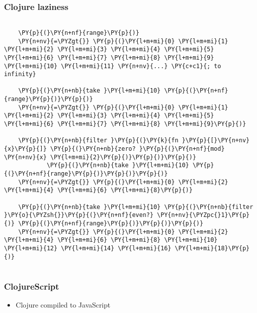 \begin{frame}[fragile]
  \frametitle{Clojure laziness}
  \begin{Verbatim}[commandchars=\\\{\}]

    \PY{p}{(}\PY{n+nf}{range}\PY{p}{)}
    \PY{n+nv}{=\PYZgt{}} \PY{p}{(}\PY{l+m+mi}{0} \PY{l+m+mi}{1} \PY{l+m+mi}{2} \PY{l+m+mi}{3} \PY{l+m+mi}{4} \PY{l+m+mi}{5} \PY{l+m+mi}{6} \PY{l+m+mi}{7} \PY{l+m+mi}{8} \PY{l+m+mi}{9} \PY{l+m+mi}{10} \PY{l+m+mi}{11} \PY{n+nv}{...} \PY{c+c1}{; to infinity}

    \PY{p}{(}\PY{n+nb}{take }\PY{l+m+mi}{10} \PY{p}{(}\PY{n+nf}{range}\PY{p}{)}\PY{p}{)}
    \PY{n+nv}{=\PYZgt{}} \PY{p}{(}\PY{l+m+mi}{0} \PY{l+m+mi}{1} \PY{l+m+mi}{2} \PY{l+m+mi}{3} \PY{l+m+mi}{4} \PY{l+m+mi}{5} \PY{l+m+mi}{6} \PY{l+m+mi}{7} \PY{l+m+mi}{8} \PY{l+m+mi}{9}\PY{p}{)}

    \PY{p}{(}\PY{n+nb}{filter }\PY{p}{(}\PY{k}{fn }\PY{p}{[}\PY{n+nv}{x}\PY{p}{]} \PY{p}{(}\PY{n+nb}{zero? }\PY{p}{(}\PY{n+nf}{mod} \PY{n+nv}{x} \PY{l+m+mi}{2}\PY{p}{)}\PY{p}{)}\PY{p}{)}
            \PY{p}{(}\PY{n+nb}{take }\PY{l+m+mi}{10} \PY{p}{(}\PY{n+nf}{range}\PY{p}{)}\PY{p}{)}\PY{p}{)}
    \PY{n+nv}{=\PYZgt{}} \PY{p}{(}\PY{l+m+mi}{0} \PY{l+m+mi}{2} \PY{l+m+mi}{4} \PY{l+m+mi}{6} \PY{l+m+mi}{8}\PY{p}{)}

    \PY{p}{(}\PY{n+nb}{take }\PY{l+m+mi}{10} \PY{p}{(}\PY{n+nb}{filter }\PY{o}{\PYZsh{}}\PY{p}{(}\PY{n+nf}{even?} \PY{n+nv}{\PYZpc{}1}\PY{p}{)} \PY{p}{(}\PY{n+nf}{range}\PY{p}{)}\PY{p}{)}\PY{p}{)}
    \PY{n+nv}{=\PYZgt{}} \PY{p}{(}\PY{l+m+mi}{0} \PY{l+m+mi}{2} \PY{l+m+mi}{4} \PY{l+m+mi}{6} \PY{l+m+mi}{8} \PY{l+m+mi}{10} \PY{l+m+mi}{12} \PY{l+m+mi}{14} \PY{l+m+mi}{16} \PY{l+m+mi}{18}\PY{p}{)}


  \end{Verbatim}
\end{frame}


\begin{frame}
  \frametitle{ClojureScript}

  \begin{itemize}
  \item<1-> Clojure compiled to JavaScript
  \end{itemize}


\end{frame}
